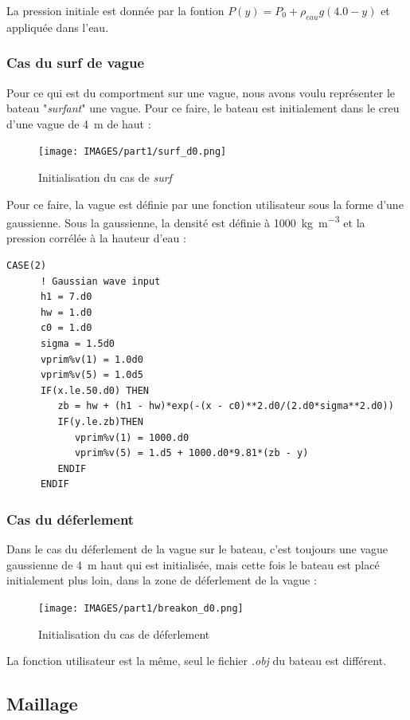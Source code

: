 \documentclass[../main.tex]{subfiles}
\begin{document}
La pression initiale est donnée par la fontion $P(y) = P_0 + \rho_{eau} g (4.0 - y)$ et appliquée dans l'eau.


\subsubsection{Cas du surf de vague}
Pour ce qui est du comportment sur une vague, nous avons voulu représenter le bateau "\textit{surfant}" une vague. Pour ce faire, le bateau est initialement dans le creu d'une vague de \qty{4}{\meter} de haut :
\begin{figure}[H]
    \centering
    \texttt{[image: IMAGES/part1/surf\_d0.png]}
    \caption{Initialisation du cas de \textit{surf}}
\end{figure}

Pour ce faire, la vague est définie par une fonction utilisateur sous la forme d'une gaussienne. Sous la gaussienne, la densité est définie à \qty{1000}{\kilo\g\per\cubic\meter} et la pression corrélée à la hauteur d'eau :
\begin{lstlisting}[style=f90, caption={Fonction utilisateur pour le cas de \textit{surf}}, captionpos=b]
    CASE(2)
      ! Gaussian wave input
      h1 = 7.d0
      hw = 1.d0
      c0 = 1.d0
      sigma = 1.5d0
      vprim%v(1) = 1.0d0
      vprim%v(5) = 1.0d5
      IF(x.le.50.d0) THEN
         zb = hw + (h1 - hw)*exp(-(x - c0)**2.d0/(2.d0*sigma**2.d0))
         IF(y.le.zb)THEN
            vprim%v(1) = 1000.d0
            vprim%v(5) = 1.d5 + 1000.d0*9.81*(zb - y)
         ENDIF
      ENDIF
\end{lstlisting}

\subsubsection{Cas du déferlement}
Dans le cas du déferlement de la vague sur le bateau, c'est toujours une vague gaussienne de \qty{4}{\meter} haut qui est initialisée, mais cette fois le bateau est placé initialement plus loin, dans la zone de déferlement de la vague : 
\begin{figure}[H]
    \centering
    \texttt{[image: IMAGES/part1/breakon\_d0.png]}
    \caption{Initialisation du cas de déferlement}
\end{figure}

La fonction utilisateur est la même, seul le fichier \textit{.obj} du bateau est différent.

\subsection{Maillage}
\end{document}
